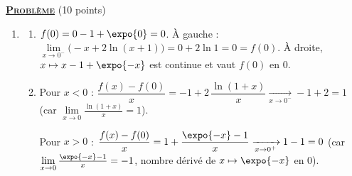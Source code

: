 \noindent \underline{\textsc{\textbf{Probl\`eme}}} (10 points)
\begin{enumerate}
   \item
      \begin{enumerate}
         \item {}
            $f(0) = 0 - 1 + \expo{0} = 0$. \`A gauche : $\lim\limits_{x\to0^-}\big(-x + 2\ln(x+1)\big) = 0 + 2\ln 1 = 0 = f(0)$.
            \`A droite, $x \mapsto x - 1 + \expo{-x}$ est continue et vaut $f(0)$ en $0$.
            \par\noindent{}
         \item {}
            Pour $x < 0$ : $\dfrac{f(x) - f(0)}{x} = -1 + 2\,\dfrac{\ln(1 + x)}{x} \xrightarrow[x\to0^-]{} -1 + 2 = 1$
            (car $\lim\limits_{x\to0}\frac{\ln(1+x)}{x} = 1$).

            Pour $x > 0$ : $\dfrac{f(x) - f(0)}{x} = 1 + \dfrac{\expo{-x} - 1}{x} \xrightarrow[x\to0^+]{} 1 - 1 = 0$
            (car $\lim\limits_{x\to0}\frac{\expo{-x} - 1}{x} = -1$, nombre d\'eriv\'e de $x \mapsto \expo{-x}$ en $0$).


\end{enumerate}
\end{enumerate}
